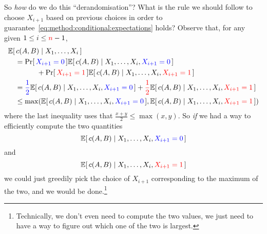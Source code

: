 So \emph{how} do we do this ``derandomisation''? What is the rule we should follow to choose $X_{i+1}$ based on previous choices in order to guarantee~\eqref{eq:method:conditional:expectations} holds? Observe that, for any given $1\leq i\leq \textcolor{red}{n}-1$, 
\begin{align*}
		&\expectCond{c(A,B) }{X_1,\dots, X_i} \\
		&\quad= \probaOf{\blue{X_{i+1}=0}}\expectCond{c(A,B) }{X_1,\dots, X_i, \blue{X_{i+1}=0}} \\
		&\qquad\qquad+ \probaOf{\red{X_{i+1}=1}}\expectCond{c(A,B) }{X_1,\dots, X_i, \red{X_{i+1}=1}} \\
		&\quad= \blue{\frac{1}{2}}\expectCond{c(A,B) }{X_1,\dots, X_i, \blue{X_{i+1}=0}}
		+ \red{\frac{1}{2}}\expectCond{c(A,B) }{X_1,\dots, X_i, \red{X_{i+1}=1}} \\
		&\quad\leq \max\Paren{\expectCond{c(A,B) }{X_1,\dots, X_i, \blue{X_{i+1}=0}} ,\expectCond{c(A,B) }{X_1,\dots, X_i, \red{X_{i+1}=1}} }
\end{align*}
where the last inequality uses that $\frac{x+y}{2} \leq \max(x,y)$. So \emph{if} we had a way to efficiently compute the two quantities 
\[
    \expectCond{c(A,B) }{X_1,\dots, X_i, \blue{X_{i+1}=0}}
\]
and 
\[
    \expectCond{c(A,B) }{X_1,\dots, X_i, \red{X_{i+1}=1}}
\]
we could just greedily pick the choice of $X_{i+1}$ corresponding to the maximum of the two, and we would be done.\footnote{Technically, we don't even need to compute the two values, we just need to have a way to figure out which one of the two is largest.}

